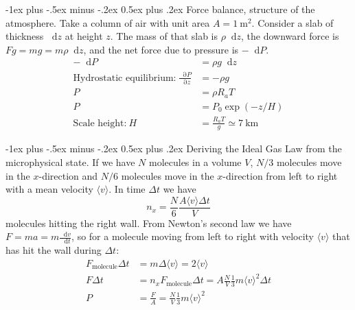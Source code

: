 \documentclass[10pt,landscape,a4paper]{article}
\makeatletter
\renewcommand\d{\mathop{}\!\mathrm{d}}
\newcommand\p{\mathop{}\!\mathrm{\partial}}
\renewcommand{\section}{\@startsection{section}{1}{0mm}%
	{-1ex plus -.5ex minus -.2ex}%
	{0.5ex plus .2ex}%
	{\normalfont\large\bfseries}}
\makeatother
\begin{document}
\begin{multicols}{3}
		\section{Force balance, structure of the atmosphere.}
		Take a column of air with unit area $ A=\SI{1}{\square\meter} $.
		Consider a slab of thickness $ \d z $ at height $ z $.
		The mass of that slab is $ \rho\d z $, the downward force is $ Fg=mg=m\rho\d z $, and the net force due to pressure is $ -\d P $.
			\begin{align*}
				-\d P&=\rho g\d z\\
				\text{Hydrostatic equilibrium:} \ \frac{\p P}{\p z}&=-\rho g\\
				P&=\rho R_aT\\
				P&=P_0\exp{(-z/H)}\\
				\text{Scale height:} \ H&=\frac{R_a T}{g}\simeq\SI{7}{\kilo\meter}
			\end{align*}
		
		\section{Deriving the Ideal Gas Law from the microphysical state.}
		If we have $ N $ molecules in a volume $ V $, $ N/3 $ molecules move in the $ x $-direction and $ N/6 $ molecules move in the $ x $-direction from left to right with a mean velocity $ \langle v\rangle $. In time $ \Delta t $ we have
		\[
			n_x=\frac{N}{6}\frac{A\langle v\rangle\Delta t}{V}
		\]
		molecules hitting the right wall.
		From Newton's second law we have $ F=ma=m\frac{\d v}{\d t} $, so for a molecule moving from left to right with velocity $ \langle v\rangle $ that has hit the wall during $ \Delta t $:
			\begin{align*}
				F_\text{molecule}\Delta t&=m\Delta\langle v\rangle=2\langle v\rangle\\
				F\Delta t&=n_xF_\text{molecule}\Delta t=A\frac{N}{V}\frac{1}{3}m{\langle v\rangle}^2\Delta t\\
				P &=\frac{F}{A}=\frac{N}{V}\frac{1}{3}m{\langle v\rangle}^2
			\end{align*}
		

\end{multicols}
\end{document}
